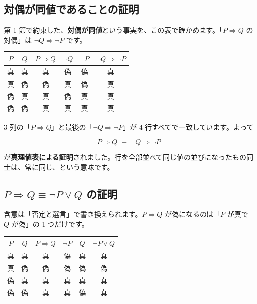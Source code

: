 \documentclass{article}
\begin{document}
\subsection{対偶が同値であることの証明}

第 1 節で約束した、\textbf{対偶が同値}という事実を、この表で確かめます。「\(P \Rightarrow Q\) の対偶」は \(\neg Q \Rightarrow \neg P\) です。

\begin{center}
\begin{tabular}{|c|c|c|c|c|c|}
\hline
\(P\) & \(Q\) & \(P \Rightarrow Q\) & \(\neg Q\) & \(\neg P\) & \(\neg Q \Rightarrow \neg P\) \\
\hline
真 & 真 & 真 & 偽 & 偽 & 真 \\
真 & 偽 & 偽 & 真 & 偽 & 真 \\
偽 & 真 & 真 & 偽 & 真 & 真 \\
偽 & 偽 & 真 & 真 & 真 & 真 \\
\hline
\end{tabular}
\end{center}

3 列の「\(P \Rightarrow Q\)」と最後の「\(\neg Q \Rightarrow \neg P\)」が 4 行すべてで一致しています。よって

\[ P \Rightarrow Q \;\equiv\; \neg Q \Rightarrow \neg P \]

が\textbf{真理値表による証明}されました。行を全部並べて同じ値の並びになったもの同士は、常に同じ、という意味です。

\subsection{\(P \Rightarrow Q \equiv \neg P \lor Q\) の証明}

含意は「否定と選言」で書き換えられます。\(P \Rightarrow Q\) が偽になるのは「\(P\) が真で \(Q\) が偽」の 1 つだけです。

\begin{center}
\begin{tabular}{|c|c|c|c|c|c|}
\hline
\(P\) & \(Q\) & \(P \Rightarrow Q\) & \(\neg P\) & \(Q\) & \(\neg P \lor Q\) \\
\hline
真 & 真 & 真 & 偽 & 真 & 真 \\
真 & 偽 & 偽 & 偽 & 偽 & 偽 \\
偽 & 真 & 真 & 真 & 真 & 真 \\
偽 & 偽 & 真 & 真 & 偽 & 真 \\
\hline
\end{tabular}
\end{center}
\end{document}
